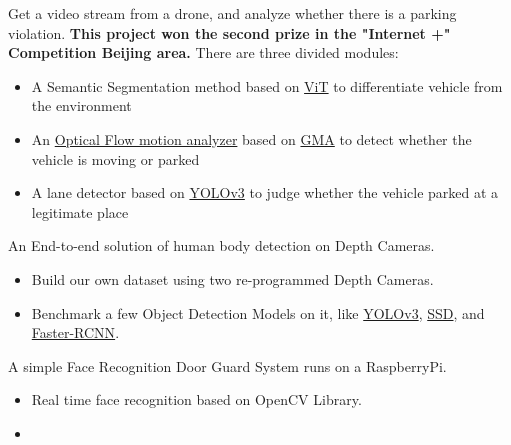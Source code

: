 \documentclass{resume}
\begin{document}
Get a video stream from a drone, and analyze whether there is a parking violation.  \textbf{This project won the second prize in the "Internet +" Competition Beijing area.} There are three divided modules:
\begin{itemize}
  \item A Semantic Segmentation method based on \href{https://arxiv.org/abs/2205.08534v3}{ViT} to differentiate vehicle from the environment
  \item An \href{https://github.com/open-mmlab/mmflow}{Optical Flow motion analyzer} based on \href{https://arxiv.org/abs/2104.02409}{GMA} to detect whether the vehicle is moving or parked
  \item A lane detector based on \href{https://arxiv.org/abs/1804.02767}{YOLOv3} to judge whether the vehicle parked at a legitimate place
\end{itemize}

An End-to-end solution of human body detection on Depth Cameras.
\begin{itemize}
  \item Build our own dataset using two re-programmed Depth Cameras. 
  \item Benchmark a few Object Detection Models on it, like \href{https://arxiv.org/abs/1804.02767}{YOLOv3}, \href{https://arxiv.org/abs/1512.02325v5}{SSD}, and \href{https://arxiv.org/abs/1506.01497v3}{Faster-RCNN}.
\end{itemize}

A simple Face Recognition Door Guard System runs on a RaspberryPi.
\begin{itemize}
  \item Real time face recognition based on OpenCV Library. 
  \item {}
\end{itemize}
\end{document}
